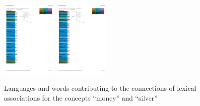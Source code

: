\begin{figure}[htbp]
\begin{center}
\includegraphics[width=0.238\textwidth]{img/moneysilverAreas1.pdf}
\includegraphics[width=0.238\textwidth]{img/moneysilverAreas2.pdf}
\caption{Languages and words contributing to the connections of lexical associations for the concepts ``money'' and ``silver''}
\label{MoneySilverAreas}
\end{center}
\end{figure}


